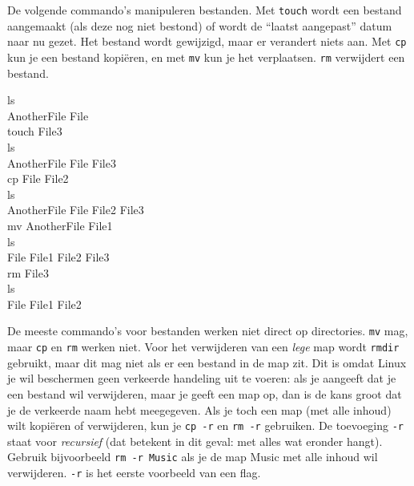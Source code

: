De volgende commando's manipuleren bestanden. Met \texttt{touch} wordt een bestand aangemaakt (als deze nog niet bestond) of wordt de ``laatst aangepast'' datum naar nu gezet. Het bestand wordt gewijzigd, maar er verandert niets aan. Met \texttt{cp} kun je een bestand kopiëren, en met \texttt{mv} kun je het verplaatsen. \texttt{rm} verwijdert een bestand.

\begin{bash}
\userprompt ls\\
AnotherFile  File\\

\userprompt touch File3\\

\userprompt ls\\
AnotherFile  File  File3\\

\userprompt cp File File2\\

\userprompt ls\\
AnotherFile  File  File2  File3\\

\userprompt mv AnotherFile File1\\

\userprompt ls\\
File  File1  File2  File3\\

\userprompt rm File3\\

\userprompt ls\\
File  File1  File2\\
\end{bash}

De meeste commando's voor bestanden werken niet direct op directories. \texttt{mv} mag, maar \texttt{cp} en \texttt{rm} werken niet. Voor het verwijderen van een \emph{lege} map wordt \texttt{rmdir} gebruikt, maar dit mag niet als er een bestand in de map zit. Dit is omdat Linux je wil beschermen geen verkeerde handeling uit te voeren: als je aangeeft dat je een bestand wil verwijderen, maar je geeft een map op, dan is de kans groot dat je de verkeerde naam hebt meegegeven. Als je toch een map (met alle inhoud) wilt kopiëren of verwijderen, kun je \texttt{cp\ -r} en \texttt{rm\ -r} gebruiken. De toevoeging \texttt{-r} staat voor \emph{recursief} (dat betekent in dit geval: met alles wat eronder hangt). Gebruik bijvoorbeeld \texttt{rm\ -r\ Music} als je de map Music met alle inhoud wil verwijderen. \texttt{-r} is het eerste voorbeeld van een flag.

